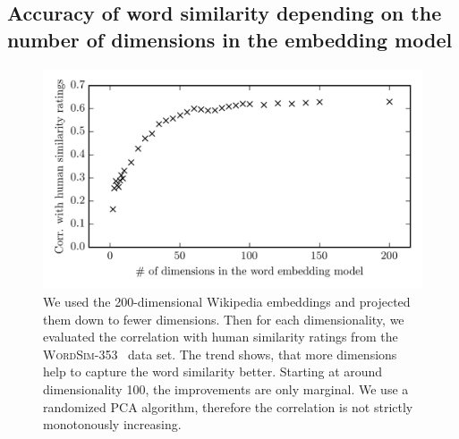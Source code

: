 \documentclass[
        a4paper,
        titlepage,
        twoside,
        parskip
        ]{scrbook}
\theoremstyle{break}
\begin{document}
\begin{appendices}
  \subsection{Accuracy of word similarity depending on the number of dimensions in the embedding model}
  \label{sec:embedding_model_dimensions_vs_similarity_corr}
  \begin{figure}[H]
         \centering
         \includegraphics[width=\textwidth]{figures/embedding_model_dimensions_vs_similarity_corr.png}
         \caption{We used the 200-dimensional Wikipedia embeddings and projected them down to fewer dimensions. Then for each dimensionality, we evaluated the correlation with human similarity ratings from the \textsc{WordSim-353}~\cite{Agirre2009} data set. The trend shows, that more dimensions help to capture the word similarity better. Starting at around dimensionality 100, the improvements are only marginal. We use a randomized PCA algorithm, therefore the correlation is not strictly monotonously increasing.}
         \label{fig:embedding_model_dimensions_vs_similarity_corr}
  \end{figure}


\end{appendices}
\end{document}
